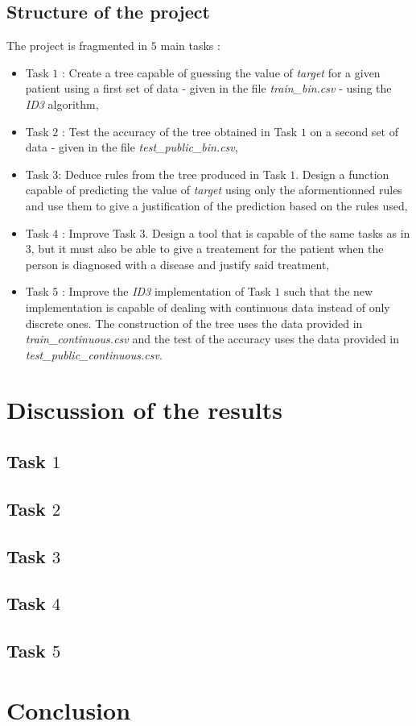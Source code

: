 \documentclass[french]{article}
\begin{document}
\subsection{Structure of the project}
The project is fragmented in $5$ main tasks :
	\begin{itemize} 
		\item Task $1$ : Create a tree capable of guessing the value of \emph{target} for a given patient using a first set of data - given in the file \emph{train\_bin.csv} - using the \emph{ID3} algorithm,
		\item Task $2$ : Test the accuracy of the tree obtained in Task $1$ on a second set of data - given in the file \emph{test\_public\_bin.csv},
		\item Task $3 $: Deduce rules from the tree produced in Task $1$. Design a function capable of predicting the value of \emph{target} using only the aformentionned rules and use them to give a justification of the prediction based on the rules used,
		\item Task $4$ : Improve Task $3$. Design a tool that is capable of the same tasks as in $3$, but it must also be able to give a treatement for the patient when the person is diagnosed with a disease and justify said treatment,
		\item Task $5$ : Improve the \emph{ID3} implementation of Task $1$ such that the new implementation is capable of dealing with continuous data instead of only discrete ones. The construction of the tree uses the data provided in \emph{train\_continuous.csv} and the test of the accuracy uses the data provided in \emph{test\_public\_continuous.csv}.
	\end{itemize}

\section{Discussion of the results}

\subsection{Task $1$}

\subsection{Task $2$}

\subsection{Task $3$}

\subsection{Task $4$}

\subsection{Task $5$}

\section{Conclusion}
\end{document}
